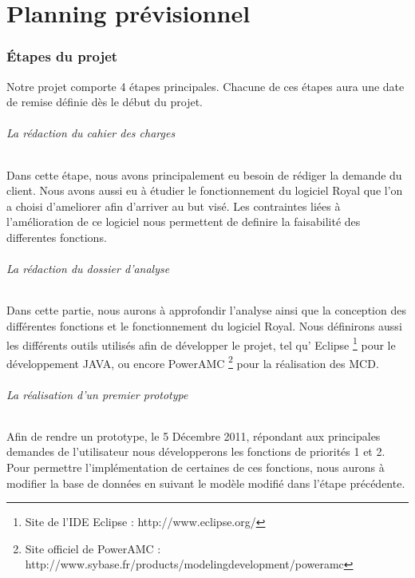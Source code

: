 \part{Planning prévisionnel}

\section{Étapes du projet}
 
Notre projet comporte 4 étapes principales. Chacune de ces étapes aura une date de remise définie dès le début du projet. 

\paragraph{La rédaction du cahier des charges}

Dans cette étape, nous avons principalement eu besoin de rédiger la demande du client. 
Nous avons aussi eu à étudier le fonctionnement du logiciel Royal que l'on a choisi d'ameliorer afin d'arriver au but visé.
Les contraintes liées à l'amélioration de ce logiciel nous permettent de definire la faisabilité des differentes fonctions. 

\paragraph{La rédaction du dossier d'analyse}

Dans cette partie, nous aurons à approfondir l'analyse ainsi que la conception des différentes fonctions et le fonctionnement du logiciel Royal. 
Nous définirons aussi les différents outils utilisés afin de développer le projet, tel qu' 
Eclipse \footnote{Site de l'IDE Eclipse : http://www.eclipse.org/} 
pour le développement JAVA, ou encore 
PowerAMC \footnote{Site officiel de PowerAMC : http://www.sybase.fr/products/modelingdevelopment/poweramc}
pour la réalisation des MCD.

\paragraph{La réalisation d'un premier prototype}

Afin de rendre un prototype, le 5 Décembre 2011, répondant aux principales demandes de l'utilisateur nous développerons les fonctions de priorités 1 et 2.
Pour permettre l'implémentation de certaines de ces fonctions, nous aurons à modifier la base de données en suivant le modèle modifié dans l'étape précédente.  

